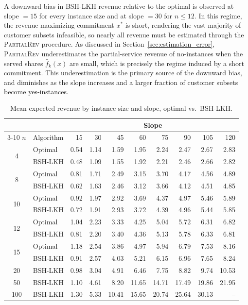 \documentclass[11pt]{article}
\theoremstyle{plain}
\theoremstyle{definition}
\begin{document}
A downward bias in BSH-\ac{LKH} revenue relative to the optimal is observed at slope
$= 15$ for every instance size and at slope $= 30$ for $n \leq 12$. In this regime,
the revenue-maximizing commitment $x^*$ is short, rendering the
vast majority of customer subsets infeasible, so nearly all revenue must be estimated
through the \textsc{PartialRev} procedure. As discussed in Section~\ref{sec:estimation_error},
\textsc{PartialRev} underestimates the partial-service revenue of no-instances when the
served shares $\hat{f}_k(x)$ are small, which is precisely the regime induced by a short
commitment. This underestimation is the primary source of the downward bias, and
diminishes as the slope increases and a larger fraction of customer subsets become
yes-instances.

\begin{table}[t]
\centering
\small
\begin{tabular}{c l rrrrrrrr}
\toprule
& & \multicolumn{8}{c}{Slope} \\
\cmidrule(lr){3-10}
$n$ & Algorithm & 15 & 30 & 45 & 60 & 75 & 90 & 105 & 120 \\
\midrule
\multirow{2}{*}{4} & Optimal & 0.54 & 1.14 & 1.59 & 1.95 & 2.24 & 2.47 & 2.67 & 2.83 \\
 & BSH-LKH & 0.48 & 1.09 & 1.55 & 1.92 & 2.21 & 2.46 & 2.66 & 2.82 \\
\midrule
\multirow{2}{*}{8} & Optimal & 0.81 & 1.71 & 2.49 & 3.15 & 3.70 & 4.17 & 4.56 & 4.89 \\
 & BSH-LKH & 0.62 & 1.63 & 2.46 & 3.12 & 3.66 & 4.12 & 4.51 & 4.85 \\
\midrule
\multirow{2}{*}{10} & Optimal & 0.92 & 1.97 & 2.92 & 3.69 & 4.37 & 4.97 & 5.46 & 5.89 \\
 & BSH-LKH & 0.72 & 1.91 & 2.93 & 3.72 & 4.39 & 4.96 & 5.44 & 5.85 \\
\midrule
\multirow{2}{*}{12} & Optimal & 1.04 & 2.23 & 3.33 & 4.25 & 5.04 & 5.72 & 6.31 & 6.82 \\
 & BSH-LKH & 0.81 & 2.20 & 3.40 & 4.36 & 5.13 & 5.78 & 6.33 & 6.81 \\
\midrule
\multirow{2}{*}{15} & Optimal & 1.18 & 2.54 & 3.86 & 4.97 & 5.94 & 6.79 & 7.53 & 8.16 \\
 & BSH-LKH & 0.91 & 2.57 & 4.03 & 5.21 & 6.15 & 6.96 & 7.65 & 8.24 \\
\midrule
20 & BSH-LKH & 0.98 & 3.04 & 4.91 & 6.46 & 7.75 & 8.82 & 9.74 & 10.53 \\
\midrule
50 & BSH-LKH & 1.10 & 4.61 & 8.20 & 11.65 & 14.71 & 17.49 & 19.86 & 21.95 \\
\midrule
100 & BSH-LKH & 1.30 & 5.33 & 10.41 & 15.65 & 20.74 & 25.64 & 30.13 & -- \\
\bottomrule
\end{tabular}
\caption{Mean expected revenue by instance size and slope, optimal vs.\ BSH-\ac{LKH}.}
\label{tab:revenue_slope}
\end{table}
\end{document}

